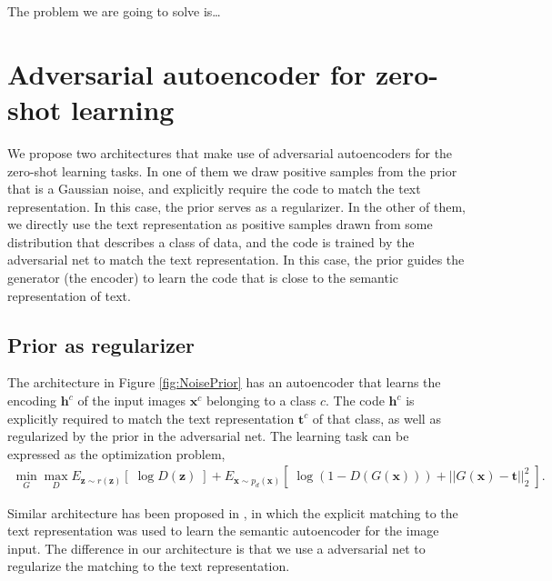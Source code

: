 \documentclass{article}
\newcommand{\bb}[1]{\boldsymbol{#1}}
\begin{document}
	The problem we are going to solve is\dots




\section{Adversarial autoencoder for zero-shot learning}

	We propose two architectures that make use of adversarial autoencoders for the zero-shot learning tasks. In one of them we draw positive samples from the prior that is a Gaussian noise, and explicitly require the code to match the text representation. In this case, the prior serves as a regularizer. In the other of them, we directly use the text representation as positive samples drawn from some distribution that describes a class of data, and the code is trained by the adversarial net to match the text representation. In this case, the prior guides the generator (the encoder) to learn the code that is close to the semantic representation of text.




\subsection{Prior as regularizer}
	
	The architecture in Figure \ref{fig:NoisePrior} has an autoencoder that learns the encoding $\bb{h}^c$ of the input images $\bb{x}^c$ belonging to a class $c$. The code $\bb{h}^c$ is explicitly required to match the text representation $\bb{t}^c$ of that class, as well as regularized by the prior in the adversarial net. The learning task can be expressed as the optimization problem,
	\begin{align}
		\min_{G} \max_D E_{\bb{z} \sim r(\bb{z})}\left[\; \log D(\bb{z}) \;\right] + E_{\bb{x} \sim p_d(\bb{x})}\left[\; \log( 1 - D(G(\bb{x})) ) + || G(\bb{x}) - \bb{t} ||_2^2 \;\right].
	\end{align}
	
	Similar architecture has been proposed in \cite{kodirov2017semantic}, in which the explicit matching to the text representation was used to learn the semantic autoencoder for the image input. The difference in our architecture is that we use a adversarial net to regularize the matching to the text representation.
	
\end{document}
